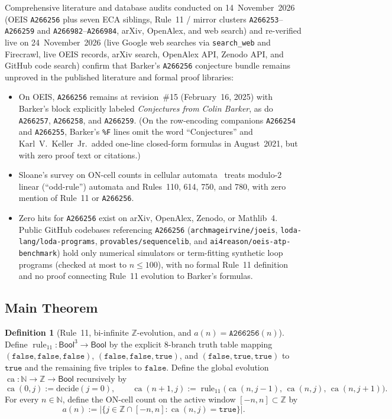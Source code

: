 \documentclass[11pt]{article}
\theoremstyle{definition}
\newtheorem{definition}[theorem]{Definition}
\newcommand{\N}{\mathbb{N}}
\newcommand{\Z}{\mathbb{Z}}
\newcommand{\seq}[1]{\texttt{#1}}
\newcommand{\ruleTT}{\operatorname{rule}_{11}}
\newcommand{\ca}{\operatorname{ca}}
\begin{document}
Comprehensive literature and database audits conducted on 14~November~2026 (OEIS \seq{A266256} plus seven ECA siblings, Rule~11 / mirror clusters \seq{A266253}--\seq{A266259} and \seq{A266982}--\seq{A266984}, arXiv, OpenAlex, and web search) and re-verified live on 24~November~2026 (live Google web searches via \texttt{search\_web} and Firecrawl, live OEIS records, arXiv search, OpenAlex API, Zenodo API, and GitHub code search) confirm that Barker's \seq{A266256} conjecture bundle remains unproved in the published literature and formal proof libraries:
\begin{itemize}
\item On OEIS, \seq{A266256} remains at revision~\#15 (February~16, 2025) with Barker's block explicitly labeled \emph{Conjectures from Colin Barker}, as do \seq{A266257}, \seq{A266258}, and \seq{A266259}. (On the row-encoding companions \seq{A266254} and \seq{A266255}, Barker's \texttt{\%F} lines omit the word ``Conjectures'' and Karl~V.\ Keller~Jr.\ added one-line closed-form formulas in August~2021, but with zero proof text or citations.)
\item Sloane's survey on ON-cell counts in cellular automata~\cite{sloane2015} treats modulo-$2$ linear (``odd-rule'') automata and Rules~110, 614, 750, and 780, with zero mention of Rule~11 or \seq{A266256}.
\item Zero hits for \seq{A266256} exist on arXiv, OpenAlex, Zenodo, or Mathlib~4. Public GitHub codebases referencing \seq{A266256} ({\small\nolinkurl{archmageirvine/joeis}}, {\small\nolinkurl{loda-lang/loda-programs}}, {\small\nolinkurl{provables/sequencelib}}, and {\small\nolinkurl{ai4reason/oeis-atp-benchmark}}) hold only numerical simulators or term-fitting synthetic loop programs (checked at most to $n \le 100$), with no formal Rule~11 definition and no proof connecting Rule~11 evolution to Barker's formulas.
\end{itemize}

\subsection{Main Theorem}

\begin{definition}[Rule~11, bi-infinite $\Z$-evolution, and $a(n) = \seq{A266256}(n)$]
\label{def:c052}
Define $\ruleTT : \mathsf{Bool}^3 \to \mathsf{Bool}$ by the explicit $8$-branch truth table mapping $(\mathtt{false}, \mathtt{false}, \mathtt{false})$, $(\mathtt{false}, \mathtt{false}, \mathtt{true})$, and $(\mathtt{false}, \mathtt{true}, \mathtt{true})$ to $\mathtt{true}$ and the remaining five triples to $\mathtt{false}$. Define the global evolution $\ca : \N \to \Z \to \mathsf{Bool}$ recursively by
\[
\ca(0, j) := \mathrm{decide}(j = 0), \qquad
\ca(n + 1, j) := \ruleTT\bigl(\ca(n, j - 1),\, \ca(n, j),\, \ca(n, j + 1)\bigr).
\]
For every $n \in \N$, define the ON-cell count on the active window $[-n, n] \subset \Z$ by
\[
a(n) := \bigl|\{j \in \Z \cap [-n, n] : \ca(n, j) = \mathtt{true}\}\bigr|.
\]
\end{definition}
\end{document}
